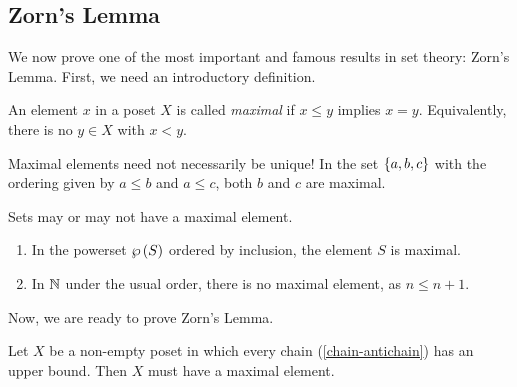 \documentclass{article}
\begin{document}

\subsection{Zorn's Lemma}

We now prove one of the most important and famous results in set theory: Zorn's Lemma. First, we need an introductory definition.

\begin{definition}
    An element $x$ in a poset $X$ is called \textit{maximal} if $x \leq y$ implies $x = y$. Equivalently, there is no $y \in X$ with $x < y$.
\end{definition}

\begin{note}
	Maximal elements need not necessarily be unique! In the set $\left\lbrace a, b, c \right\rbrace$ with the ordering given by $a \leq b$ and $a \leq c$, both $b$ and $c$ are maximal.
\end{note}

\begin{example}
	Sets may or may not have a maximal element.
    \begin{enumerate}
    	\item In the powerset $\wp\left(S\right)$ ordered by inclusion, the element $S$ is maximal.
    	\item In $\mathbb{N}$ under the usual order, there is no maximal element, as $n \leq n+1$.
	\end{enumerate}
\end{example}

Now, we are ready to prove Zorn's Lemma.

\begin{theorem}
	\label{zorns-lemma}
    Let $X$ be a non-empty poset in which every chain (\ref{chain-antichain}) has an upper bound. Then $X$ must have a maximal element.
\end{theorem}
\end{document}

